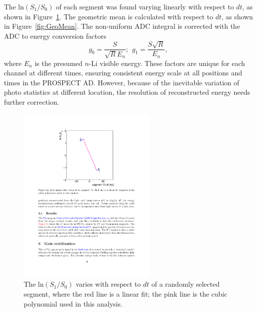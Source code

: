 The ln$(S_1/S_0)$ of each segment was found varying linearly with respect to $dt$, as shown in Figure~\ref{fig:lnR}.
The geometric mean is calculated with respect to $dt$, as shown in Figure~\ref{fig:GeoMean}.
The non-uniform ADC integral is corrected with the ADC to energy conversion factors
\begin{equation}
g_0 = \frac{S}{\sqrt{R}E_n}; \ 		\ g_1 = \frac{S\sqrt{R}}{E_n},
\end{equation}
where $E_n$ is the presumed $n$-Li visible energy.
These factors are unique for each channel at different times, ensuring consistent energy scale at all positions and times in the PROSPECT AD.
However, because of the inevitable variation of photo statistics at different location, the resolution of reconstructed energy needs further correction.
\begin{figure}[ht]
\centering
\includegraphics[width=0.6\textwidth]{Figures/lnRvsdt.pdf}
\caption[ln$(S_1/S_0)$ vs $dt$ of a segment ] {
The ln$(S_1/S_0)$ varies with respect to $dt$ of a randomly selected segment, where the red line is a linear fit; the pink line is the cubic polynomial used in this analysis.
}
\label{fig:lnR}
\end{figure}
